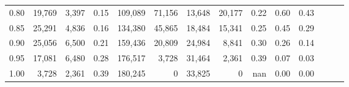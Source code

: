 \begin{tabular}{rrrrrrrrrrrrrr}
0.80 &  19,769 &  3,397 &  0.15 &  109,089 &   71,156 &  13,648 &  20,177 &  0.22 &  0.60 &      0.43 \\
0.85 &  25,291 &  4,836 &  0.16 &  134,380 &   45,865 &  18,484 &  15,341 &  0.25 &  0.45 &      0.29 \\
0.90 &  25,056 &  6,500 &  0.21 &  159,436 &   20,809 &  24,984 &   8,841 &  0.30 &  0.26 &      0.14 \\
0.95 &  17,081 &  6,480 &  0.28 &  176,517 &    3,728 &  31,464 &   2,361 &  0.39 &  0.07 &      0.03 \\
1.00 &   3,728 &  2,361 &  0.39 &  180,245 &        0 &  33,825 &       0 &   nan &  0.00 &      0.00 \\
\bottomrule
\end{tabular}
